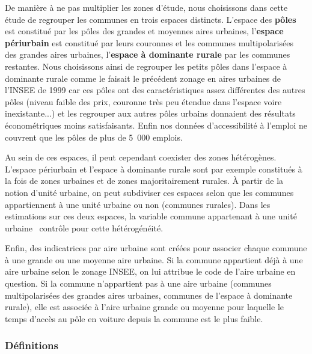 \documentclass[10.5pt,a4paper]{article}
\begin{document}
{{De manière à ne pas multiplier les zones d'étude, nous choisissons dans cette étude de regrouper les communes en trois espaces distincts. L'espace des \textbf{pôles} est constitué par les pôles des grandes et moyennes aires urbaines, l'\textbf{espace périurbain} est constitué par leurs couronnes et les communes multipolarisées des grandes aires urbaines, l'\textbf{espace à dominante rurale} par les communes restantes. Nous choisissons ainsi de regrouper les petits pôles dans l'espace à dominante rurale comme le faisait le précédent zonage en aires urbaines de l'INSEE de 1999 car ces pôles ont des caractéristiques assez différentes des autres pôles (niveau faible des prix, couronne très peu étendue dans l'espace voire inexistante...) et les regrouper aux autres pôles urbains donnaient des résultats économétriques moins satisfaisants. Enfin nos données d'accessibilité à l'emploi ne couvrent que les pôles de plus de 5~000 emplois. \par  

Au sein de ces espaces, il peut cependant coexister des zones hétérogènes. L'espace périurbain et l'espace à dominante rurale sont par exemple constitués à la fois de zones urbaines et de zones majoritairement rurales. \`{A} partir de la notion d'unité urbaine, on peut subdiviser ces espaces selon que les communes appartiennent à une unité urbaine ou non (communes rurales). Dans les estimations sur ces deux espaces, la variable \og commune appartenant à une unité urbaine \fg~contrôle pour cette hétérogénéité. \par  

\begin{center}

\end{center}

Enfin, des indicatrices par aire urbaine sont créées pour associer chaque commune à une grande ou une moyenne aire urbaine. Si la commune appartient déjà à une aire urbaine selon le zonage INSEE, on lui attribue le code de l'aire urbaine en question. Si la commune n'appartient pas à une aire urbaine (communes multipolarisées des grandes aires urbaines, communes de l'espace à dominante rurale), elle est associée à l'aire urbaine grande ou moyenne pour laquelle le temps d'accès au pôle en voiture depuis la commune est le plus faible. \par   

\subsubsection{\textbf{Définitions}}

}}
\end{document}
